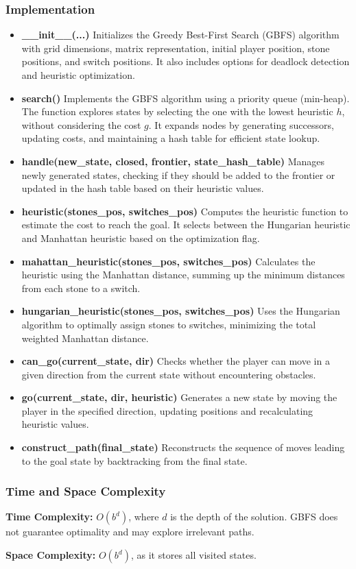 \subsubsection{Implementation}
\begin{itemize}
    \item \textbf{\_\_init\_\_(...)}  
    Initializes the Greedy Best-First Search (GBFS) algorithm with grid dimensions, matrix representation, initial player position, stone positions, and switch positions. It also includes options for deadlock detection and heuristic optimization.

    \item \textbf{search()}  
    Implements the GBFS algorithm using a priority queue (min-heap). The function explores states by selecting the one with the lowest heuristic \( h \), without considering the cost \( g \). It expands nodes by generating successors, updating costs, and maintaining a hash table for efficient state lookup.

    \item \textbf{handle(new\_state, closed, frontier, state\_hash\_table)}  
    Manages newly generated states, checking if they should be added to the frontier or updated in the hash table based on their heuristic values.

    \item \textbf{heuristic(stones\_pos, switches\_pos)}  
    Computes the heuristic function to estimate the cost to reach the goal. It selects between the Hungarian heuristic and Manhattan heuristic based on the optimization flag.

    \item \textbf{mahattan\_heuristic(stones\_pos, switches\_pos)}  
    Calculates the heuristic using the Manhattan distance, summing up the minimum distances from each stone to a switch.

    \item \textbf{hungarian\_heuristic(stones\_pos, switches\_pos)}  
    Uses the Hungarian algorithm to optimally assign stones to switches, minimizing the total weighted Manhattan distance.

    \item \textbf{can\_go(current\_state, dir)}  
    Checks whether the player can move in a given direction from the current state without encountering obstacles.

    \item \textbf{go(current\_state, dir, heuristic)}  
    Generates a new state by moving the player in the specified direction, updating positions and recalculating heuristic values.

    \item \textbf{construct\_path(final\_state)}  
    Reconstructs the sequence of moves leading to the goal state by backtracking from the final state.

\end{itemize}

\subsubsection{Time and Space Complexity}
\textbf{Time Complexity:} \( O(b^d) \), where \( d \) is the depth of the solution. GBFS does not guarantee optimality and may explore irrelevant paths.

\textbf{Space Complexity:} \( O(b^d) \), as it stores all visited states.